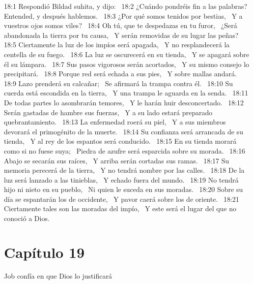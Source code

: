 18:1 Respondió Bildad suhita, y dijo:  
18:2 ¿Cuándo pondréis fin a las palabras?  
Entended, y después hablemos.  
18:3 ¿Por qué somos tenidos por bestias,  
Y a vuestros ojos somos viles?  
18:4 Oh tú, que te despedazas en tu furor,  
¿Será abandonada la tierra por tu causa,  
Y serán removidas de su lugar las peñas? 
18:5 Ciertamente la luz de los impíos será apagada,  
Y no resplandecerá la centella de su fuego.  
18:6 La luz se oscurecerá en su tienda,  
Y se apagará sobre él su lámpara.  
18:7 Sus pasos vigorosos serán acortados,  
Y su mismo consejo lo precipitará.  
18:8 Porque red será echada a sus pies,  
Y sobre mallas andará.  
18:9 Lazo prenderá su calcañar;  
Se afirmará la trampa contra él.  
18:10 Su cuerda está escondida en la tierra,  
Y una trampa le aguarda en la senda.  
18:11 De todas partes lo asombrarán temores,  
Y le harán huir desconcertado.  
18:12 Serán gastadas de hambre sus fuerzas,  
Y a su lado estará preparado quebrantamiento.  
18:13 La enfermedad roerá su piel,  
Y a sus miembros devorará el primogénito de la muerte.  
18:14 Su confianza será arrancada de su tienda,  
Y al rey de los espantos será conducido.  
18:15 En su tienda morará como si no fuese suya;  
Piedra de azufre será esparcida sobre su morada.  
18:16 Abajo se secarán sus raíces,  
Y arriba serán cortadas sus ramas.  
18:17 Su memoria perecerá de la tierra,  
Y no tendrá nombre por las calles.  
18:18 De la luz será lanzado a las tinieblas,  
Y echado fuera del mundo.  
18:19 No tendrá hijo ni nieto en su pueblo,  
Ni quien le suceda en sus moradas.  
18:20 Sobre su día se espantarán los de occidente,  
Y pavor caerá sobre los de oriente.  
18:21 Ciertamente tales son las moradas del impío,  
Y este será el lugar del que no conoció a Dios.  
\section*{Capítulo 19}
Job confía en que Dios lo justificará  

